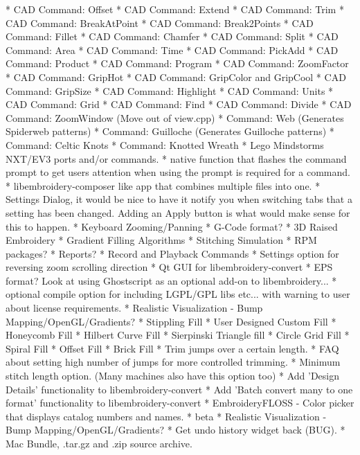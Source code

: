\documentclass[11pt]{report}
\begin{document}
    * CAD Command: Offset
    * CAD Command: Extend
    * CAD Command: Trim
    * CAD Command: BreakAtPoint
    * CAD Command: Break2Points
    * CAD Command: Fillet
    * CAD Command: Chamfer
    * CAD Command: Split
    * CAD Command: Area
    * CAD Command: Time
    * CAD Command: PickAdd
    * CAD Command: Product
    * CAD Command: Program
    * CAD Command: ZoomFactor
    * CAD Command: GripHot
    * CAD Command: GripColor and GripCool
    * CAD Command: GripSize
    * CAD Command: Highlight
    * CAD Command: Units
    * CAD Command: Grid
    * CAD Command: Find
    * CAD Command: Divide
    * CAD Command: ZoomWindow (Move out of view.cpp)
    * Command: Web (Generates Spiderweb patterns)
    * Command: Guilloche (Generates Guilloche patterns)
    * Command: Celtic Knots
    * Command: Knotted Wreath
    * Lego Mindstorms NXT/EV3 ports and/or commands.
    * native function that flashes the command prompt to get users attention when using the prompt is required for a command.
    * libembroidery-composer like app that combines multiple files into one.
    * Settings Dialog, it would be nice to have it notify you when switching tabs that a setting has been changed. Adding an Apply button is what would make sense for this to happen.
    * Keyboard Zooming/Panning
    * G-Code format?
    * 3D Raised Embroidery
    * Gradient Filling Algorithms
    * Stitching Simulation
    * RPM packages?
    * Reports?
    * Record and Playback Commands
    * Settings option for reversing zoom scrolling direction
    * Qt GUI for libembroidery-convert
    * EPS format? Look at using Ghostscript as an optional add-on to libembroidery...
    * optional compile option for including LGPL/GPL libs etc... with warning to user about license requirements.
    * Realistic Visualization - Bump Mapping/OpenGL/Gradients?
    * Stippling Fill
    * User Designed Custom Fill
    * Honeycomb Fill
    * Hilbert Curve Fill
    * Sierpinski Triangle fill
    * Circle Grid Fill
    * Spiral Fill
    * Offset Fill
    * Brick Fill
    * Trim jumps over a certain length.
    * FAQ about setting high number of jumps for more controlled trimming.
    * Minimum stitch length option. (Many machines also have this option too)
    * Add 'Design Details' functionality to libembroidery-convert
    * Add 'Batch convert many to one format' functionality to libembroidery-convert
    * EmbroideryFLOSS - Color picker that displays catalog numbers and names.
* beta
    * Realistic Visualization - Bump Mapping/OpenGL/Gradients?
    * Get undo history widget back (BUG).
    * Mac Bundle, .tar.gz and .zip source archive.
\end{document}
